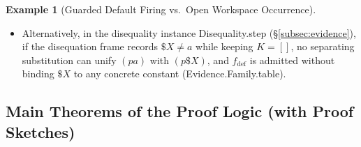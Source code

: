\documentclass[11pt,a4paper]{article}
\theoremstyle{definition}
\newtheorem{example}[theorem]{Example}
\DeclareRobustCommand{\lean}[1]{%
  \ifmmode\text{\normalfont\ttfamily\footnotesize\detokenize{#1}}%
  \else{\normalfont\footnotesize\leanurl{#1}}\fi}
\DeclareRobustCommand{\metta}[1]{\text{\normalfont\ttfamily\footnotesize #1}}
\def\lean#1{#1}%
\def\metta#1{#1}%
\begin{document}
\begin{example}[Guarded Default Firing vs.\ Open Workspace Occurrence]
\begin{enumerate}[leftmargin=2em, nosep]
\begin{itemize}[nosep]
    \item Alternatively, in the disequality instance \lean{Disequality.step} (\S\ref{subsec:evidence}), if the disequation frame records $\$X \neq \metta{a}$ while keeping $K = []$, no separating substitution can unify $\metta{(p a)}$ with $\metta{(p \$X)}$, and $f_{\mathrm{def}}$ is admitted without binding $\$X$ to any concrete constant (\lean{Evidence.Family.table}).
  \end{itemize}
\end{enumerate}
\end{example}

\subsection{Main Theorems of the Proof Logic (with Proof Sketches)}
\end{document}
